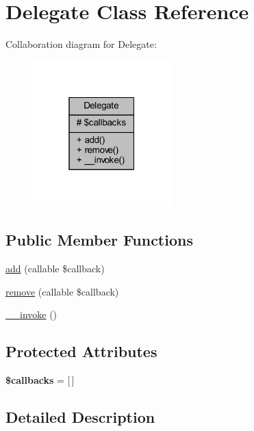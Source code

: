 \hypertarget{class_delegate}{}\section{Delegate Class Reference}
\label{class_delegate}


Collaboration diagram for Delegate\+:\nopagebreak
\begin{figure}[H]
\begin{center}
\leavevmode
\includegraphics[width=151pt]{class_delegate__coll__graph}
\end{center}
\end{figure}
\subsection*{Public Member Functions}
\begin{DoxyCompactItemize}
\item 
\hyperlink{class_delegate_a2db8611725175f0ef569cb2ee7d1ef24}{add} (callable \$callback)
\item 
\hyperlink{class_delegate_aba650b6c889c96ddacd660d1e4e1a1d7}{remove} (callable \$callback)
\item 
\hyperlink{class_delegate_a9aac7e1475efe923de4e19cc2511f092}{\+\_\+\+\_\+invoke} ()
\end{DoxyCompactItemize}
\subsection*{Protected Attributes}
\begin{DoxyCompactItemize}
\item 
\mbox{\label{class_delegate_a151f6e603ac02a25364ad54bee36ab2a}} 
{\bfseries \$callbacks} = \mbox{[}$\,$\mbox{]}
\end{DoxyCompactItemize}


\subsection{Detailed Description}


